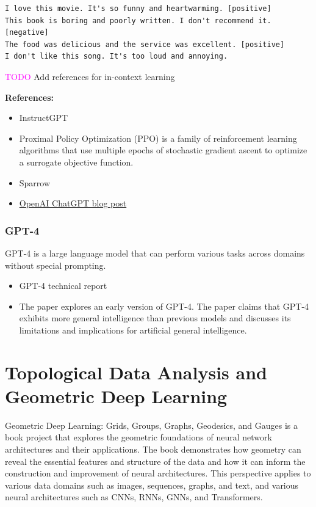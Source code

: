\documentclass[11pt, a4paper]{amsart}
\begin{document}
\begin{lstlisting}
I love this movie. It's so funny and heartwarming. [positive]
This book is boring and poorly written. I don't recommend it. [negative]
The food was delicious and the service was excellent. [positive]
I don't like this song. It's too loud and annoying.
\end{lstlisting}


\textcolor{magenta}{TODO} Add references for in-context learning



\noindent \textbf{References:}
\begin{itemize}
	\item InstructGPT  \cite{ouyang2022training}
	\item Proximal Policy Optimization (PPO) \cite{schulman2017proximal} is a family of reinforcement learning algorithms that use multiple epochs of stochastic gradient ascent to optimize a surrogate objective function.
	\item Sparrow \cite{glaese2022improving}
	\item \href{https://openai.com/blog/chatgpt}{OpenAI ChatGPT blog post}
\end{itemize}

\subsubsection{GPT-4}

GPT-4 is a large language model that can perform various tasks across domains without special prompting.

\begin{itemize}
	\item GPT-4 technical report \cite{openai2023gpt4}
	\item The paper \cite{bubeck2023sparks} explores an early version of GPT-4.
	The paper claims that GPT-4 exhibits more general intelligence than previous models and discusses its limitations and implications for artificial general intelligence.
\end{itemize}


\section{Topological Data Analysis and Geometric Deep Learning}

Geometric Deep Learning: Grids, Groups, Graphs, Geodesics, and Gauges is a book project \cite{bronstein2021geometric} that explores the geometric foundations of neural network architectures and their applications.
The book demonstrates how geometry can reveal the essential features and structure of the data and how it can inform the construction and improvement of neural architectures.
This perspective applies to various data domains such as images, sequences, graphs, and text, and various neural architectures such as CNNs, RNNs, GNNs, and Transformers.
\end{document}
